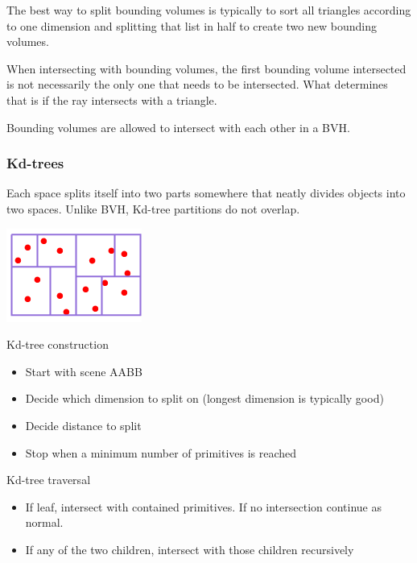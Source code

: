 \documentclass[12pt]{article}
\begin{document}
The best way to split bounding volumes is typically to sort all triangles
according to one dimension and splitting that list in half to create
two new bounding volumes.

When intersecting with bounding volumes, the first bounding volume
intersected is not necessarily the only one that needs to be intersected.
What determines that is if the ray intersects with a triangle.

Bounding volumes are allowed to intersect with each other in a BVH.

\subsubsection{Kd-trees}

Each space splits itself into two parts somewhere that neatly
divides objects into two spaces. Unlike BVH, Kd-tree partitions do not overlap.

\includegraphics{images/kd-tree.png}

Kd-tree construction
\begin{itemize}
    \item Start with scene AABB
    \item Decide which dimension to split on (longest dimension is
        typically good)
    \item Decide distance to split
    \item Stop when a minimum number of primitives is reached
\end{itemize}

Kd-tree traversal
\begin{itemize}
    \item If leaf, intersect with contained primitives. If no intersection
        continue as normal.
    \item If any of the two children, intersect with those children recursively
\end{itemize}
\end{document}
